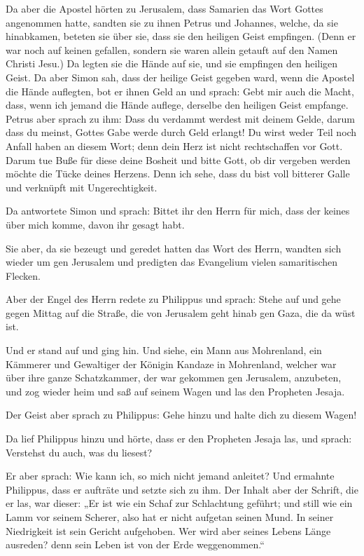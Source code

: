  Da aber die Apostel hörten zu Jerusalem, dass Samarien
das Wort Gottes angenommen hatte, sandten sie zu ihnen Petrus und
Johannes,  welche, da sie hinabkamen, beteten sie über
sie, dass sie den heiligen Geist empfingen.  (Denn er war
noch auf keinen gefallen, sondern sie waren allein getauft auf den Namen
Christi Jesu.)  Da legten sie die Hände auf sie, und sie
empfingen den heiligen Geist.  Da aber Simon sah, dass
der heilige Geist gegeben ward, wenn die Apostel die Hände auflegten,
bot er ihnen Geld an  und sprach: Gebt mir auch die
Macht, dass, wenn ich jemand die Hände auflege, derselbe den heiligen
Geist empfange.  Petrus aber sprach zu ihm: Dass du
verdammt werdest mit deinem Gelde, darum dass du meinst, Gottes Gabe
werde durch Geld erlangt!  Du wirst weder Teil noch
Anfall haben an diesem Wort; denn dein Herz ist nicht rechtschaffen vor
Gott.  Darum tue Buße für diese deine Bosheit und bitte
Gott, ob dir vergeben werden möchte die Tücke deines Herzens.
 Denn ich sehe, dass du bist voll bitterer Galle und
verknüpft mit Ungerechtigkeit.

 Da antwortete Simon und sprach: Bittet ihr den Herrn für
mich, dass der keines über mich komme, davon ihr gesagt habt.

 Sie aber, da sie bezeugt und geredet hatten das Wort des
Herrn, wandten sich wieder um gen Jerusalem und predigten das Evangelium
vielen samaritischen Flecken.

 Aber der Engel des Herrn redete zu Philippus und sprach:
Stehe auf und gehe gegen Mittag auf die Straße, die von Jerusalem geht
hinab gen Gaza, die da wüst ist.

 Und er stand auf und ging hin. Und siehe, ein Mann aus
Mohrenland, ein Kämmerer und Gewaltiger der Königin Kandaze in
Mohrenland, welcher war über ihre ganze Schatzkammer, der war gekommen
gen Jerusalem, anzubeten,  und zog wieder heim und saß
auf seinem Wagen und las den Propheten Jesaja.

 Der Geist aber sprach zu Philippus: Gehe hinzu und halte
dich zu diesem Wagen!

 Da lief Philippus hinzu und hörte, dass er den Propheten
Jesaja las, und sprach: Verstehst du auch, was du liesest?

 Er aber sprach: Wie kann ich, so mich nicht jemand
anleitet? Und ermahnte Philippus, dass er aufträte und setzte sich zu
ihm.  Der Inhalt aber der Schrift, die er las, war
dieser: „Er ist wie ein Schaf zur Schlachtung geführt; und still wie ein
Lamm vor seinem Scherer, also hat er nicht aufgetan seinen Mund.
 In seiner Niedrigkeit ist sein Gericht aufgehoben. Wer
wird aber seines Lebens Länge ausreden? denn sein Leben ist von der Erde
weggenommen.``

